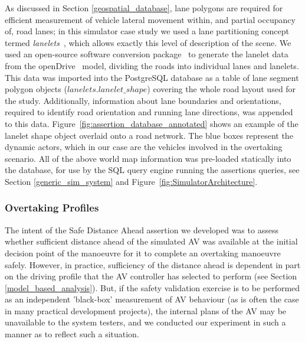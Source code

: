 
As discussed in Section \ref{geospatial_database}, lane polygons are required for efficient measurement of vehicle lateral movement within, and partial occupancy of, road lanes; in this simulator case study we used a lane partitioning concept termed \textit{lanelets}~\cite{lanelets2014}, which allows exactly this level of description of the scene. We used an open-source software conversion package~\cite{lanelets_to_openDrive} to generate the lanelet data from the openDrive~\cite{opendrive} model, dividing the roads into individual lanes and lanelets. This data was imported into the PostgreSQL database as a table of lane segment polygon objects ($lanelets.lanelet\_shape$) covering the whole road layout used for the study. Additionally, information about lane boundaries and orientations, required to identify road orientation and running lane directions, was appended to this data. 
%
Figure~\ref{fig:assertion_database_annotated} shows an example of the lanelet shape object overlaid onto a road network. The blue boxes represent the dynamic actors, which in our case are the vehicles involved in the overtaking scenario. 
%
All of the above world map information was pre-loaded statically into the database, for use by the SQL query engine running the assertions queries, see Section \ref{generic_sim_system} and 	Figure~\ref{fig:SimulatorArchitecture}.

\subsubsection{Overtaking Profiles} \label{overtaking_profiles}
The intent of the Safe Distance Ahead assertion we developed was to assess whether sufficient distance ahead of the simulated AV was available at the initial decision point of the manoeuvre for it to complete an overtaking manoeuvre safely. However, in practice, sufficiency of the distance ahead is dependent in part on the driving profile that the AV controller has selected to perform (see Section \ref{model_based_analysis}). But, if the safety validation exercise is to be performed as an independent 'black-box' measurement of AV behaviour (as is often the case in many practical development projects), the internal plans of the AV may be unavailable to the system testers, and we conducted our experiment in such a manner as to reflect such a situation.


